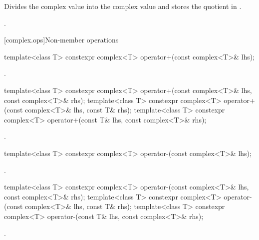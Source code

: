 \begin{itemdescr}
\pnum
\effects
Divides the complex value  into the complex value
and stores the quotient in
.

\pnum
\returns
{}.
\end{itemdescr}

[complex.ops]{Non-member operations}

%
\begin{itemdecl}
template<class T> constexpr complex<T> operator+(const complex<T>& lhs);
\end{itemdecl}

\begin{itemdescr}
\pnum
\returns
{}.

\end{itemdescr}

\begin{itemdecl}
template<class T> constexpr complex<T> operator+(const complex<T>& lhs, const complex<T>& rhs);
template<class T> constexpr complex<T> operator+(const complex<T>& lhs, const T& rhs);
template<class T> constexpr complex<T> operator+(const T& lhs, const complex<T>& rhs);
\end{itemdecl}

\begin{itemdescr}
\pnum
\returns
{}.
\end{itemdescr}

%
\begin{itemdecl}
template<class T> constexpr complex<T> operator-(const complex<T>& lhs);
\end{itemdecl}

\begin{itemdescr}
\pnum
\returns
{}.
\end{itemdescr}

%
\begin{itemdecl}
template<class T> constexpr complex<T> operator-(const complex<T>& lhs, const complex<T>& rhs);
template<class T> constexpr complex<T> operator-(const complex<T>& lhs, const T& rhs);
template<class T> constexpr complex<T> operator-(const T& lhs, const complex<T>& rhs);
\end{itemdecl}

\begin{itemdescr}
\pnum
\returns
{}.
\end{itemdescr}

